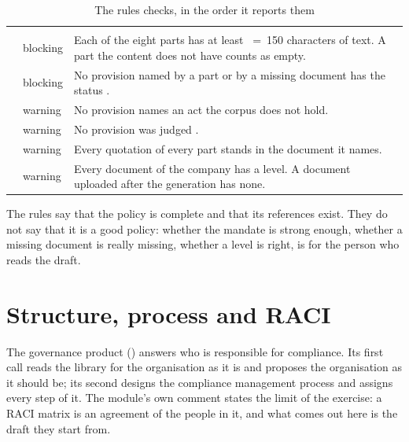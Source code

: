 \begin{xltabular}{\textwidth}{@{}L{37mm}L{17mm}Y@{}}
\caption{The rules  checks, in the order it reports them}\label{tab:programme:policyrules}\\
\toprule
{} &  &  \\
\midrule
\endfirsthead
\toprule
{} &  &  \\
\midrule
\endhead
\bottomrule
\endlastfoot
{} & blocking & Each of the eight parts has at least ~=~150 characters of text. A part the content does not have counts as empty. \\
 & blocking & No provision named by a part or by a missing document has the status . \\
 & warning & No provision names an act the corpus does not hold. \\
 & warning & No provision was judged . \\
 & warning & Every quotation of every part stands in the document it names. \\
 & warning & Every document of the company has a level. A document uploaded after the generation has none. \\
\end{xltabular}

The rules say that the policy is complete and that its references exist. They do not say
that it is a good policy: whether the mandate is strong enough, whether a missing document is
really missing, whether a level is right, is for the person who reads the draft.


\section{Structure, process and RACI}\label{sec:programme:governance}

The governance product () answers who is responsible for
compliance. Its first call reads the library for the organisation as it is and proposes the
organisation as it should be; its second designs the compliance management process and
assigns every step of it. The module's own comment states the limit of the exercise: a RACI
matrix is an agreement of the people in it, and what comes out here is the draft they start
from.

